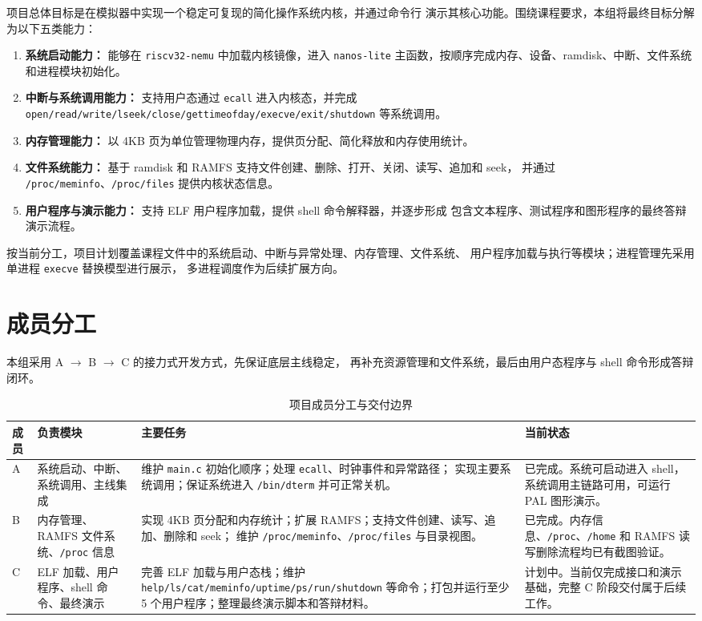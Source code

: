 \documentclass[UTF8,a4paper,zihao=-4]{ctexart}
\begin{document}
项目总体目标是在模拟器中实现一个稳定可复现的简化操作系统内核，并通过命令行
演示其核心功能。围绕课程要求，本组将最终目标分解为以下五类能力：

\begin{enumerate}
  \item \textbf{系统启动能力：} 能够在 \texttt{riscv32-nemu} 中加载内核镜像，进入
  \texttt{nanos-lite} 主函数，按顺序完成内存、设备、ramdisk、中断、文件系统和进程模块初始化。
  \item \textbf{中断与系统调用能力：} 支持用户态通过 \texttt{ecall} 进入内核态，并完成
  \texttt{open/read/write/lseek/close/gettimeofday/execve/exit/shutdown} 等系统调用。
  \item \textbf{内存管理能力：} 以 4KB 页为单位管理物理内存，提供页分配、简化释放和内存使用统计。
  \item \textbf{文件系统能力：} 基于 ramdisk 和 RAMFS 支持文件创建、删除、打开、关闭、读写、追加和 seek，
  并通过 \texttt{/proc/meminfo}、\texttt{/proc/files} 提供内核状态信息。
  \item \textbf{用户程序与演示能力：} 支持 ELF 用户程序加载，提供 shell 命令解释器，并逐步形成
  包含文本程序、测试程序和图形程序的最终答辩演示流程。
\end{enumerate}

按当前分工，项目计划覆盖课程文件中的系统启动、中断与异常处理、内存管理、文件系统、
用户程序加载与执行等模块；进程管理先采用单进程 \texttt{execve} 替换模型进行展示，
多进程调度作为后续扩展方向。

\section{成员分工}

本组采用 A $\rightarrow$ B $\rightarrow$ C 的接力式开发方式，先保证底层主线稳定，
再补充资源管理和文件系统，最后由用户态程序与 shell 命令形成答辩闭环。

\begin{table}[htbp]
\centering
\caption{项目成员分工与交付边界}
\begin{tabular}{p{1.3cm}p{3.2cm}p{5.2cm}p{4.2cm}}
\toprule
成员 & 负责模块 & 主要任务 & 当前状态 \\
\midrule
A & 系统启动、中断、系统调用、主线集成
& 维护 \texttt{main.c} 初始化顺序；处理 \texttt{ecall}、时钟事件和异常路径；
实现主要系统调用；保证系统进入 \texttt{/bin/dterm} 并可正常关机。
& 已完成。系统可启动进入 shell，系统调用主链路可用，可运行 PAL 图形演示。 \\
\midrule
B & 内存管理、RAMFS 文件系统、\texttt{/proc} 信息
& 实现 4KB 页分配和内存统计；扩展 RAMFS；支持文件创建、读写、追加、删除和 seek；
维护 \texttt{/proc/meminfo}、\texttt{/proc/files} 与目录视图。
& 已完成。内存信息、\texttt{/proc}、\texttt{/home} 和 RAMFS 读写删除流程均已有截图验证。 \\
\midrule
C & ELF 加载、用户程序、shell 命令、最终演示
& 完善 ELF 加载与用户态栈；维护 \texttt{help/ls/cat/meminfo/uptime/ps/run/shutdown}
等命令；打包并运行至少 5 个用户程序；整理最终演示脚本和答辩材料。
& 计划中。当前仅完成接口和演示基础，完整 C 阶段交付属于后续工作。 \\
\bottomrule
\end{tabular}
\end{table}
\end{document}
